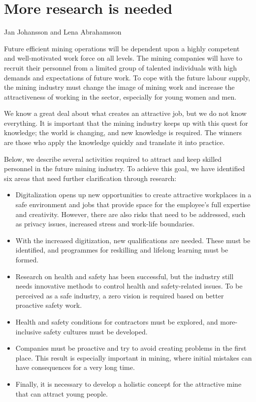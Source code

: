 \documentclass[
  12pt,
]{scrbook}
\newenvironment{chap-auth}
{\vspace{1cm}\begin{center}\begin{flushright}\sffamily\noindent}
  {\end{flushright}\end{center}\vspace{1cm}}
\begin{document}
\hypertarget{more-research-is-needed}{%
\chapter{More research is needed}\label{more-research-is-needed}}

\begin{chap-auth}
Jan Johansson and Lena Abrahamsson
\end{chap-auth}

Future efficient mining operations will be dependent upon a highly competent and well-motivated work force on all levels. The mining companies will have to recruit their personnel from a limited group of talented individuals with high demands and expectations of future work. To cope with the future labour supply, the mining industry must change the image of mining work and increase the attractiveness of working in the sector, especially for young women and men.

We know a great deal about what creates an attractive job, but we do not know everything. It is important that the mining industry keeps up with this quest for knowledge; the world is changing, and new knowledge is required. The winners are those who apply the knowledge quickly and translate it into practice.

Below, we describe several activities required to attract and keep skilled personnel in the future mining industry. To achieve this goal, we have identified six areas that need further clarification through research:

\begin{itemize}
\item
  Digitalization opens up new opportunities to create attractive workplaces in a safe environment and jobs that provide space for the employee's full expertise and creativity. However, there are also risks that need to be addressed, such as privacy issues, increased stress and work-life boundaries.
\item
  With the increased digitization, new qualifications are needed. These must be identified, and programmes for reskilling and lifelong learning must be formed.
\item
  Research on health and safety has been successful, but the industry still needs innovative methods to control health and safety-related issues. To be perceived as a safe industry, a zero vision is required based on better proactive safety work.
\item
  Health and safety conditions for contractors must be explored, and more-inclusive safety cultures must be developed.
\item
  Companies must be proactive and try to avoid creating problems in the first place. This result is especially important in mining, where initial mistakes can have consequences for a very long time.
\item
  Finally, it is necessary to develop a holistic concept for the attractive mine that can attract young people.
\end{itemize}
\end{document}
